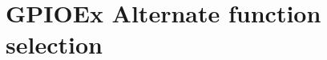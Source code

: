 \hypertarget{group___g_p_i_o_ex___alternate__function__selection}{}\section{G\+P\+I\+O\+Ex Alternate function selection}
\label{group___g_p_i_o_ex___alternate__function__selection}
